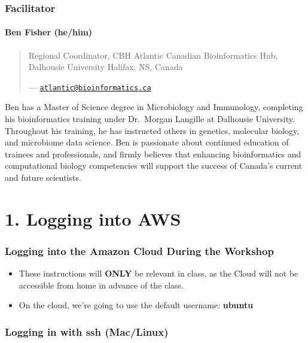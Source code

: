 \documentclass[
]{book}
\begin{document}
\subsection{Facilitator}\label{facilitator}

\subsubsection{Ben Fisher (he/him)}\label{ben-fisher-hehim}

\begin{quote}
Regional Coordinator, CBH Atlantic
Canadian Bioinformatics Hub, Dalhousie University
Halifax, NS, Canada

--- \href{mailto:atlantic@bioinformatics.ca}{\nolinkurl{atlantic@bioinformatics.ca}}
\end{quote}

Ben has a Master of Science degree in Microbiology and Immunology, completing his bioinformatics training under Dr.~Morgan Langille at Dalhousie University. Throughout his training, he has instructed others in genetics, molecular biology, and microbiome data science. Ben is passionate about continued education of trainees and professionals, and firmly believes that enhancing bioinformatics and computational biology competencies will support the success of Canada's current and future scientists.

\chapter{1. Logging into AWS}\label{logging-into-aws}

\subsection{Logging into the Amazon Cloud During the Workshop}\label{logging-into-the-amazon-cloud-during-the-workshop}

\begin{itemize}
\item
  These instructions will \textbf{ONLY} be relevant in class, as the Cloud will not be accessible from home in advance of the class.
\item
  On the cloud, we're going to use the default username: \textbf{ubuntu}
\end{itemize}

\subsection{Logging in with ssh (Mac/Linux)}\label{logging-in-with-ssh-maclinux}
\end{document}
